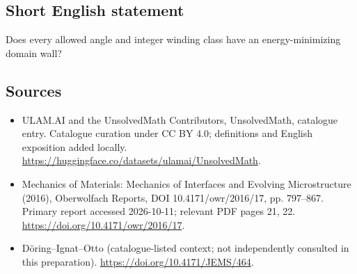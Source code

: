 \documentclass[11pt]{article}
\begin{document}
\subsection{Short English statement}
Does every allowed angle and integer winding class have an energy-minimizing domain wall?
\subsection{Sources}
\begin{itemize}
\item[\hypertarget{source:statement:1}{S1}] ULAM.AI and the UnsolvedMath Contributors, UnsolvedMath, catalogue entry. Catalogue curation under CC BY 4.0; definitions and English exposition added locally.
\url{https://huggingface.co/datasets/ulamai/UnsolvedMath}.
\item[\hypertarget{source:statement:2}{S2}] Mechanics of Materials: Mechanics of Interfaces and Evolving Microstructure (2016), Oberwolfach Reports, DOI 10.4171/owr/2016/17, pp. 797--867. Primary report accessed 2026-10-11; relevant PDF pages 21, 22.
\url{https://doi.org/10.4171/owr/2016/17}.
\item[\hypertarget{source:statement:3}{S3}] Döring--Ignat--Otto (catalogue-listed context; not independently consulted in this preparation).
\url{https://doi.org/10.4171/JEMS/464}.
\end{itemize}
\label{end:statement}
\end{document}

